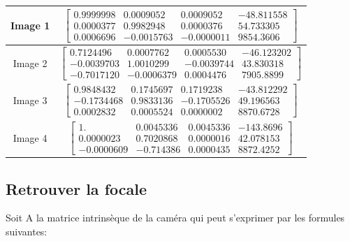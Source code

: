 \documentclass[a4paper,11pt]{article}
\begin{document}
\begin{tabular}{|c|c|}
  \hline
  Image 1 
  &
  $\begin{bmatrix}
    0.9999998 &   0.0009052 &   0.0009052 & - 48.811558\\
    0.0000377 &   0.9982948 &   0.0000376 &   54.733305\\
    0.0006696 & - 0.0015763 & - 0.0000011 &   9854.3606
  \end{bmatrix}$
  \\
  \hline
  Image 2 
  & 
  $\begin{bmatrix}
      0.7124496 &   0.0007762 &   0.0005530 & - 46.123202  \\
    - 0.0039703 &   1.0010299 & - 0.0039744 &   43.830318  \\
    - 0.7017120 & - 0.0006379 &   0.0004476 &   7905.8899 
  \end{bmatrix}$
  \\
  \hline
  Image 3 
  & 
  $\begin{bmatrix}
      0.9848432 &   0.1745697 &   0.1719238 & - 43.812292  \\
    - 0.1734468 &   0.9833136 & - 0.1705526 &   49.196563  \\
      0.0002832 &   0.0005524 &   0.0000002 &   8870.6728 
  \end{bmatrix}$
  \\
  \hline
  Image 4
  & 
  $\begin{bmatrix}
      1.        &   0.0045336 &   0.0045336 & - 143.8696   \\
      0.0000023 &   0.7020868 &   0.0000016 &   42.078153  \\
    - 0.0000609 & - 0.714386  &   0.0000435 &   8872.4252 
  \end{bmatrix}$
  \\
  \hline
\end{tabular}

\subsection{Retrouver la focale}

Soit A la matrice intrinsèque de la caméra qui peut s'exprimer par les formules suivantes:
\end{document}
